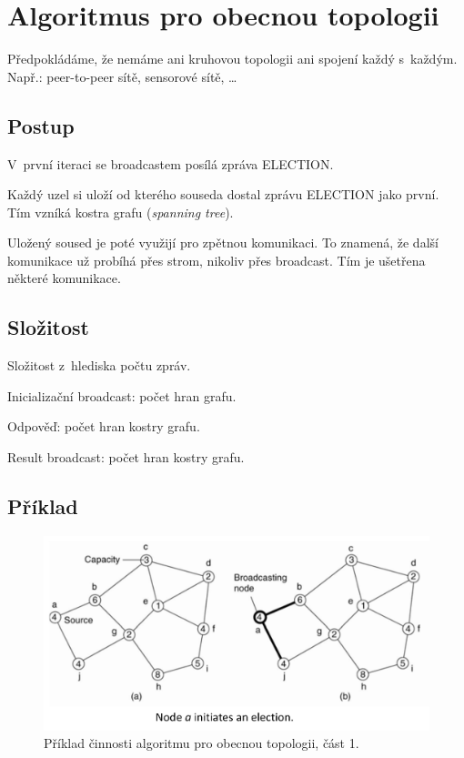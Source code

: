 
\section{Algoritmus pro obecnou topologii}

Předpokládáme, že nemáme ani kruhovou topologii ani spojení každý s~každým. Např.: peer-to-peer sítě, sensorové sítě, \dots

\subsection{Postup}

\begin{compactitem}
    \item V~první iteraci se broadcastem posílá zpráva ELECTION.
    \item Každý uzel si uloží od kterého souseda dostal zprávu ELECTION jako první. Tím vzníká kostra grafu (\textit{spanning tree}).
    \item Uložený soused je poté využijí pro zpětnou komunikaci. To znamená, že další komunikace už probíhá přes strom, nikoliv přes broadcast. Tím je ušetřena některé komunikace.
\end{compactitem}

\subsection{Složitost}

Složitost z~hlediska počtu zpráv.

\begin{compactitem}
    \item Inicializační broadcast: počet hran grafu.
    \item Odpověď: počet hran kostry grafu.
    \item Result broadcast: počet hran kostry grafu.
\end{compactitem}

\subsection{Příklad}

\begin{figure}[H]
    \centering
    \includegraphics[width=1\linewidth]{example_general_topology_p1.pdf}
    \caption{Příklad činnosti algoritmu pro obecnou topologii, část 1.}
\end{figure}

